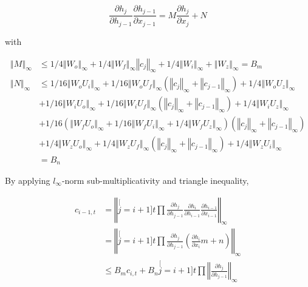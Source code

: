 \[
\frac{\partial h_{j}}{\partial h_{j-1}}\frac{\partial h_{j-1}}{\partial x_{j-1}}=M\frac{\partial h_{j}}{\partial x_{j}}+N
\]

with

\begin{align*}
\left\Vert M\right\Vert _{\infty} & \leq1/4\left\Vert W_{o}\right\Vert _{\infty}+1/4\left\Vert W_{f}\right\Vert _{\infty}\left\Vert c_{j}\right\Vert _{\infty}+1/4\left\Vert W_{i}\right\Vert _{\infty}+\left\Vert W_{z}\right\Vert _{\infty}=B_{m}\\
\left\Vert N\right\Vert _{\infty} & \leq1/16\left\Vert W_{o}U_{i}\right\Vert _{\infty}+1/16\left\Vert W_{o}U_{f}\right\Vert _{\infty}\left(\left\Vert c_{j}\right\Vert _{\infty}+\left\Vert c_{j-1}\right\Vert _{\infty}\right)+1/4\left\Vert W_{o}U_{z}\right\Vert _{\infty}\\
 & +1/16\left\Vert W_{i}U_{o}\right\Vert _{\infty}+1/16\left\Vert W_{i}U_{f}\right\Vert _{\infty}\left(\left\Vert c_{j}\right\Vert _{\infty}+\left\Vert c_{j-1}\right\Vert _{\infty}\right)+1/4\left\Vert W_{i}U_{z}\right\Vert _{\infty}\\
 & +1/16\left(\left\Vert W_{f}U_{o}\right\Vert _{\infty}+1/16\left\Vert W_{f}U_{i}\right\Vert _{\infty}+1/4\left\Vert W_{f}U_{z}\right\Vert _{\infty}\right)\left(\left\Vert c_{j}\right\Vert _{\infty}+\left\Vert c_{j-1}\right\Vert _{\infty}\right)\\
 & +1/4\left\Vert W_{z}U_{o}\right\Vert _{\infty}+1/4\left\Vert W_{z}U_{f}\right\Vert _{\infty}\left(\left\Vert c_{j}\right\Vert _{\infty}+\left\Vert c_{j-1}\right\Vert _{\infty}\right)+1/4\left\Vert W_{z}U_{i}\right\Vert _{\infty}\\
 & =B_{n}
\end{align*}

By applying $l_{\infty}$-norm sub-multiplicativity and triangle inequality,

\begin{align*}
c_{i-1,t} & =\left\Vert \stackrel[j=i+1]{t}{\prod}\frac{\partial h_{j}}{\partial h_{j-1}}\frac{\partial h_{i}}{\partial h_{i-1}}\frac{\partial h_{i-1}}{\partial x_{i-1}}\right\Vert _{\infty}\\
 & =\left\Vert \stackrel[j=i+1]{t}{\prod}\frac{\partial h_{j}}{\partial h_{j-1}}\left(\frac{\partial h_{i}}{\partial x_{i}}m+n\right)\right\Vert _{\infty}\\
 & \leq B_{m}c_{i,t}+B_{n}\stackrel[j=i+1]{t}{\prod}\left\Vert \frac{\partial h_{j}}{\partial h_{j-1}}\right\Vert _{\infty}
\end{align*}

